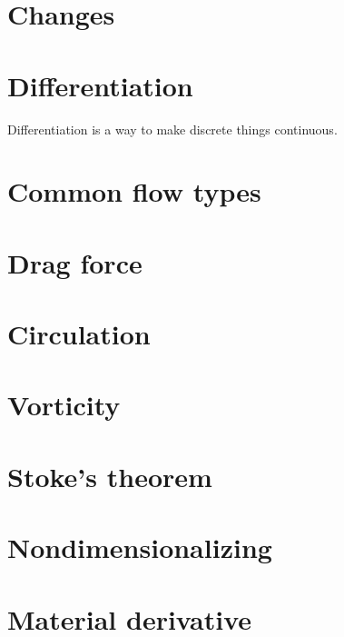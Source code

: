\documentclass[10pt]{report}
\begin{document}
\chapter{Changes}




\chapter{Differentiation}

Differentiation is a way to make discrete things continuous.

\chapter{Common flow types}






\chapter{Drag force}





\chapter{Circulation}



\chapter{Vorticity}



\chapter{Stoke's theorem}



\chapter{Nondimensionalizing}



\chapter{Material derivative}
\end{document}
